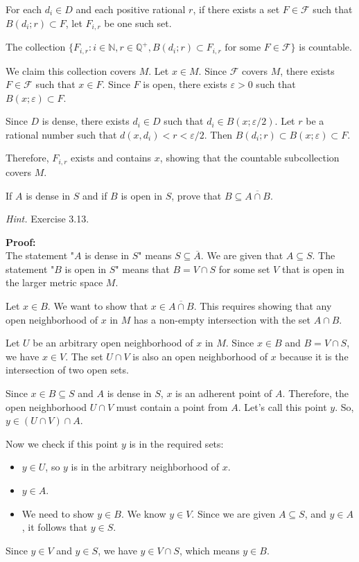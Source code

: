 For each $d_i \in D$ and each positive rational $r$, if there exists a set $F \in \mathcal{F}$ such that $B(d_i;r) \subset F$, let $F_{i,r}$ be one such set.

The collection $\{F_{i,r} : i \in \mathbb{N}, r \in \mathbb{Q}^+, B(d_i;r) \subset F_{i,r} \text{ for some } F \in \mathcal{F}\}$ is countable.

We claim this collection covers $M$. Let $x \in M$. Since $\mathcal{F}$ covers $M$, there exists $F \in \mathcal{F}$ such that $x \in F$. Since $F$ is open, there exists $\varepsilon > 0$ such that $B(x;\varepsilon) \subset F$.

Since $D$ is dense, there exists $d_i \in D$ such that $d_i \in B(x;\varepsilon/2)$. Let $r$ be a rational number such that $d(x,d_i) < r < \varepsilon/2$. Then $B(d_i;r) \subset B(x;\varepsilon) \subset F$.

Therefore, $F_{i,r}$ exists and contains $x$, showing that the countable subcollection covers $M$.

\begin{problembox}
If \( A \) is dense in \( S \) and if \( B \) is open in \( S \), prove that \( B \subseteq \overline{A \cap B} \).

\textit{Hint.} Exercise 3.13.
\end{problembox}

\textbf{Proof:}\\
The statement "$A$ is dense in $S$" means $S \subseteq \overline{A}$. We are given that $A \subseteq S$.
The statement "$B$ is open in $S$" means that $B = V \cap S$ for some set $V$ that is open in the larger metric space $M$.

Let $x \in B$. We want to show that $x \in \overline{A \cap B}$. This requires showing that any open neighborhood of $x$ in $M$ has a non-empty intersection with the set $A \cap B$.

Let $U$ be an arbitrary open neighborhood of $x$ in $M$.
Since $x \in B$ and $B = V \cap S$, we have $x \in V$.
The set $U \cap V$ is also an open neighborhood of $x$ because it is the intersection of two open sets.

Since $x \in B \subseteq S$ and $A$ is dense in $S$, $x$ is an adherent point of $A$. Therefore, the open neighborhood $U \cap V$ must contain a point from $A$. Let's call this point $y$.
So, $y \in (U \cap V) \cap A$.

Now we check if this point $y$ is in the required sets:
\begin{itemize}
    \item $y \in U$, so $y$ is in the arbitrary neighborhood of $x$.
    \item $y \in A$.
    \item We need to show $y \in B$. We know $y \in V$. Since we are given $A \subseteq S$, and $y \in A$, it follows that $y \in S$.
\end{itemize}
Since $y \in V$ and $y \in S$, we have $y \in V \cap S$, which means $y \in B$.

